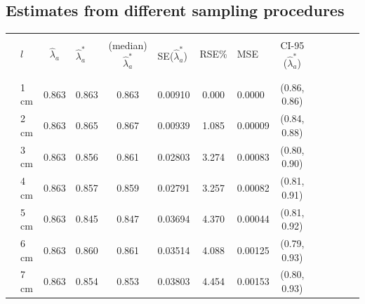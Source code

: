 \documentclass[a4paper 12pt]{article}
\numberwithin{equation}{section}
\begin{document}
{\subsection{Estimates from different sampling procedures}
\label{secAP:resultssamplingprocedure}
\clearpage
 \begin{small}
\begin{table}[h!]
\centering
\setlength\tabcolsep{11.5pt} 
\begin{footnotesize}
\begin{tabular}{clclclclclclcl}
  \hline \\ [0.3ex]
&  $l$ & $\hat{\lambda}_{a}$  & $\hat{\lambda}_{a}^{*}$ & (median) $\hat{\lambda}_{a}^{*}$ & SE($\hat{\lambda}_{a}^{*}$) & RSE\%  & MSE  &  CI-95 ($\hat{\lambda}_{a}^{*}$) \\ [1.0ex]
\hline \\
 \raisebox{1ex}{\bf age 1}  \\ [1.0ex]
&   1 cm & 0.863 &    0.863  & 0.863 &         0.00910& 0.000 & 0.0000  & (0.86, 0.86)\\
&   2 cm & 0.863 &    0.865  & 0.867 &         0.00939& 1.085 & 0.00009 & (0.84, 0.88)\\
&   3 cm & 0.863 &    0.856  & 0.861 &         0.02803& 3.274 & 0.00083 & (0.80, 0.90) \\
&   4 cm & 0.863 &    0.857  & 0.859 &         0.02791& 3.257 & 0.00082 & (0.81, 0.91) \\
&   5 cm & 0.863 &    0.845  & 0.847 &         0.03694& 4.370 & 0.00044 & (0.81, 0.92)\\
&   6 cm & 0.863 &    0.860  & 0.861 &         0.03514& 4.088 & 0.00125 & (0.79, 0.93)\\
&   7 cm & 0.863 &    0.854  & 0.853 &         0.03803& 4.454 & 0.00153 & (0.80, 0.93)\\[1.5ex]


\end{tabular}
\end{footnotesize}
\end{table}
\end{small}}
\end{document}

